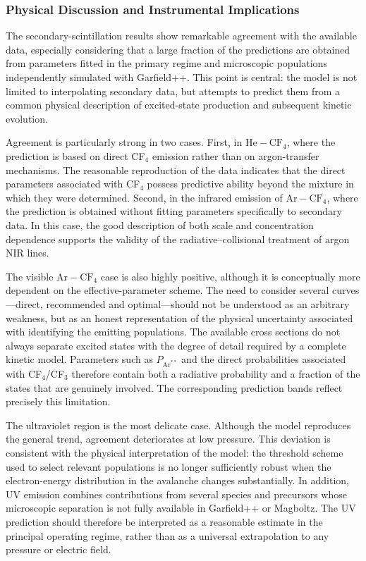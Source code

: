 \documentclass[12pt,a4paper]{article}
\newcommand{\He}{\mathrm{He}}
\newcommand{\Ar}{\mathrm{Ar}}
\newcommand{\CF}{\mathrm{CF}}
\begin{document}
\subsubsection{Physical Discussion and Instrumental Implications}

The secondary-scintillation results show remarkable agreement with the available data, especially considering that a large fraction of the predictions are obtained from parameters fitted in the primary regime and microscopic populations independently simulated with Garfield++. This point is central: the model is not limited to interpolating secondary data, but attempts to predict them from a common physical description of excited-state production and subsequent kinetic evolution.

Agreement is particularly strong in two cases. First, in $\He-\CF_4$, where the prediction is based on direct CF$_4$ emission rather than on argon-transfer mechanisms. The reasonable reproduction of the data indicates that the direct parameters associated with CF$_4$ possess predictive ability beyond the mixture in which they were determined. Second, in the infrared emission of $\Ar-\CF_4$, where the prediction is obtained without fitting parameters specifically to secondary data. In this case, the good description of both scale and concentration dependence supports the validity of the radiative--collisional treatment of argon NIR lines.

The visible $\Ar-\CF_4$ case is also highly positive, although it is conceptually more dependent on the effective-parameter scheme. The need to consider several curves---direct, recommended and optimal---should not be understood as an arbitrary weakness, but as an honest representation of the physical uncertainty associated with identifying the emitting populations. The available cross sections do not always separate excited states with the degree of detail required by a complete kinetic model. Parameters such as $P_{\Ar^{**}}$ and the direct probabilities associated with CF$_4$/CF$_3$ therefore contain both a radiative probability and a fraction of the states that are genuinely involved. The corresponding prediction bands reflect precisely this limitation.

The ultraviolet region is the most delicate case. Although the model reproduces the general trend, agreement deteriorates at low pressure. This deviation is consistent with the physical interpretation of the model: the threshold scheme used to select relevant populations is no longer sufficiently robust when the electron-energy distribution in the avalanche changes substantially. In addition, UV emission combines contributions from several species and precursors whose microscopic separation is not fully available in Garfield++ or Magboltz. The UV prediction should therefore be interpreted as a reasonable estimate in the principal operating regime, rather than as a universal extrapolation to any pressure or electric field.
\end{document}
